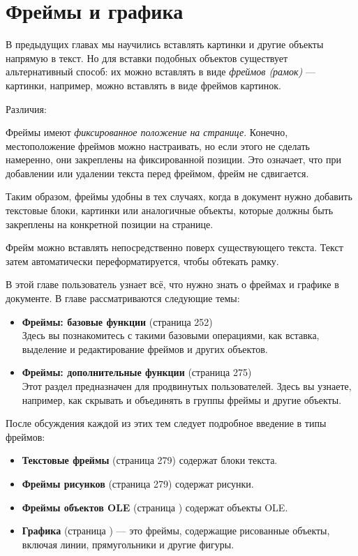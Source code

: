 \documentclass[a4paper,10pt]{article}
\begin{document}
\section{Фреймы и графика}
В предыдущих главах мы научились вставлять картинки и другие объекты напрямую в текст. Но для вставки подобных объектов существует альтернативный способ: их можно вставлять в виде \textit{фреймов (рамок)} --- картинки, например, можно вставлять в виде фреймов картинок.

Различия:

Фреймы имеют \textit{фиксированное положение на странице}. Конечно, местоположение фреймов можно настраивать, но если этого не сделать намеренно, они закреплены на фиксированной позиции. Это означает, что при добавлении или удалении текста перед фреймом, фрейм не сдвигается.

Таким образом, фреймы удобны в тех случаях, когда в документ нужно добавить текстовые блоки, картинки или аналогичные объекты, которые должны быть закреплены на конкретной позиции на странице.

Фрейм можно вставлять непосредственно поверх существующего текста. Текст затем автоматически переформатируется, чтобы обтекать рамку.

В этой главе пользователь узнает всё, что нужно знать о фреймах и графике в документе. В главе рассматриваются следующие темы:

\begin{itemize}
 \item \textbf{Фреймы: базовые функции} (страница 252)\\
 Здесь вы познакомитесь с такими базовыми операциями, как вставка, выделение и редактирование фреймов и других объектов.
 \item \textbf{Фреймы: дополнительные функции} (страница 275)\\
 Этот раздел предназначен для продвинутых пользователей. Здесь вы узнаете, например, как скрывать и объединять в группы фреймы и другие объекты.
 \end{itemize}
 
После обсуждения каждой из этих тем следует подробное введение в типы фреймов:

\begin{itemize}
 \item \textbf{Текстовые фреймы} (страница 279) содержат блоки текста.
 \item \textbf{Фреймы рисунков}  (страница 279) содержат рисунки.
 \item \textbf{Фреймы объектов OLE} (страница ) содержат объекты OLE.
 \item \textbf{Графика} (страница ) --- это фреймы, содержащие рисованные объекты, включая линии, прямугольники и другие фигуры.
\end{itemize}
\end{document}
